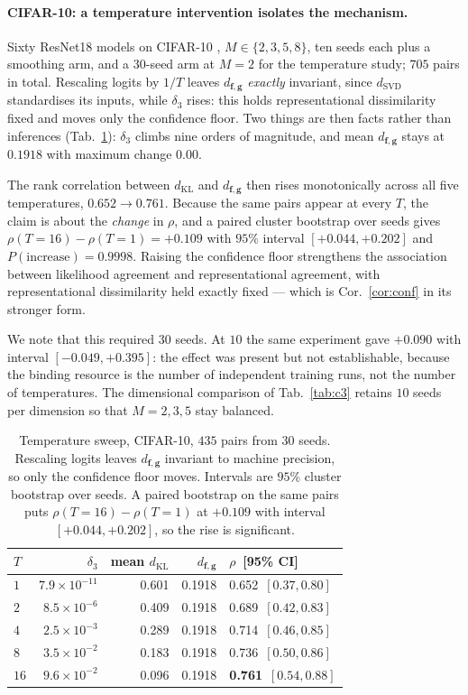 \documentclass[10pt,letterpaper,twocolumn]{article}
\newcommand{\bff}{\mathbf{f}}
\newcommand{\bfg}{\mathbf{g}}
\newcommand{\dKL}{d_{\mathrm{KL}}}
\newcommand{\dSVD}{d_{\mathrm{SVD}}}
\newcommand{\dfg}{d_{\bff,\bfg}}
\theoremstyle{plain}
\theoremstyle{definition}
\theoremstyle{remark}
\begin{document}
\paragraph{CIFAR-10: a temperature intervention isolates the mechanism.}
Sixty ResNet18 \citep{he2016} models on CIFAR-10 \citep{krizhevsky2009},
$M\in\{2,3,5,8\}$, ten seeds each plus a smoothing arm, and a $30$-seed arm
at $M{=}2$ for the temperature study; $705$ pairs in total. Rescaling
logits by $1/T$ leaves $\dfg$ \emph{exactly} invariant, since $\dSVD$
standardises its inputs, while $\delta_{3}$ rises: this holds representational
dissimilarity fixed and moves only the confidence floor. Two things are then
facts rather than inferences (Tab.~\ref{tab:temp}): $\delta_{3}$ climbs nine
orders of magnitude, and mean $\dfg$ stays at $0.1918$ with maximum change
$0.00$.

The rank correlation between $\dKL$ and $\dfg$ then rises monotonically across
all five temperatures, $0.652\to0.761$. Because the same pairs appear at every
$T$, the claim is about the \emph{change} in $\rho$, and a paired cluster
bootstrap over seeds gives $\rho(T{=}16)-\rho(T{=}1)=+0.109$ with $95\%$
interval $[+0.044,+0.202]$ and $P(\text{increase})=0.9998$. Raising the
confidence floor strengthens the association between likelihood agreement and
representational agreement, with representational dissimilarity held exactly
fixed --- which is Cor.~\ref{cor:conf} in its stronger form.

We note that this required $30$ seeds. At $10$ the same experiment gave
$+0.090$ with interval $[-0.049,+0.395]$: the effect was present but not
establishable, because the binding resource is the number of independent
training runs, not the number of temperatures. The dimensional comparison of
Tab.~\ref{tab:c3} retains $10$ seeds per dimension so that $M{=}2,3,5$ stay
balanced.


\begin{table}[t]
\centering\small
\caption{Temperature sweep, CIFAR-10, $435$ pairs from $30$ seeds. Rescaling
logits leaves $\dfg$ invariant to machine precision, so only the confidence
floor moves. Intervals are $95\%$ cluster bootstrap over seeds. A paired
bootstrap on the same pairs puts $\rho(T{=}16)-\rho(T{=}1)$ at $+0.109$ with
interval $[+0.044,+0.202]$, so the rise is significant.}
\label{tab:temp}
\begin{tabular}{@{}lrrrl@{}}
\toprule
$T$ & $\delta_{3}$ & mean $\dKL$ & $\dfg$ & $\rho$ \,[95\% CI] \\
\midrule
$1$  & $7.9\!\times\!10^{-11}$ & 0.601 & 0.1918 & 0.652 \,$[0.37,0.80]$ \\
$2$  & $8.5\!\times\!10^{-6}$  & 0.409 & 0.1918 & 0.689 \,$[0.42,0.83]$ \\
$4$  & $2.5\!\times\!10^{-3}$  & 0.289 & 0.1918 & 0.714 \,$[0.46,0.85]$ \\
$8$  & $3.5\!\times\!10^{-2}$  & 0.183 & 0.1918 & 0.736 \,$[0.50,0.86]$ \\
$16$ & $9.6\!\times\!10^{-2}$  & 0.096 & 0.1918 & \textbf{0.761} \,$[0.54,0.88]$ \\
\bottomrule
\end{tabular}
\end{table}
\end{document}
